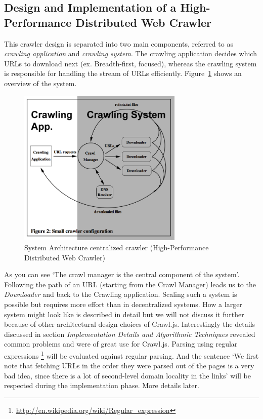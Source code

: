 \subsection{Design and Implementation of a High-Performance Distributed Web Crawler~\cite{hp_crawler}}
This crawler design is separated into two main components, referred to as \emph{crawling application} and \emph{crawling system}. The crawling application decides which URLs to download next (ex. Breadth-first, focused), whereas the crawling system is responsible for handling the stream of URLs efficiently. Figure~\ref{hp_crawler} shows an overview of the system.
\begin{figure}[h]
\centering
  \includegraphics[width=0.7\textwidth]{Figures/hp_crawler.png}
\caption{System Architecture centralized crawler (High-Performance Distributed Web Crawler)}
\label{hp_crawler}
\end{figure}
As you can see `The crawl manager is the central component of the system'. Following the path of an URL (starting from the Crawl Manager) leads us to the \emph{Downloader} and back to the Crawling application. Scaling such a system is possible but requires more effort than in decentralized systems. How a larger system might look like is described in detail but we will not discuss it further because of other architectural design choices of Crawl.js.
Interestingly the details discussed in section \emph{Implementation Details and Algorithmic Techniques} revealed common problems and were of great use for Crawl.js. Parsing using regular expressions \footnote{\url{http://en.wikipedia.org/wiki/Regular_expression}} will be evaluated against regular parsing. And the sentence `We first note that fetching URLs in the order they were parsed out of the pages is a very bad idea, since there is a lot of second-level domain locality in the links' will be respected during the implementation phase. More details later. 

